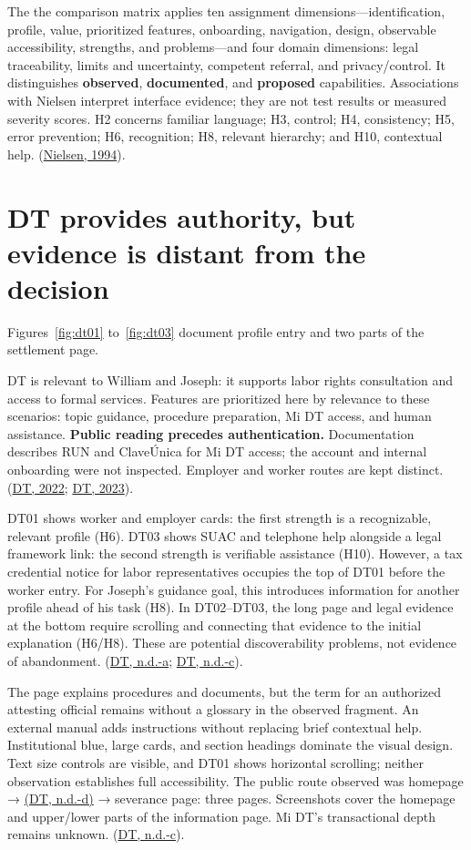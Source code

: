 The the comparison matrix applies ten assignment dimensions—identification, profile, value, prioritized features, onboarding, navigation, design, observable accessibility, strengths, and problems—and four domain dimensions: legal traceability, limits and uncertainty, competent referral, and privacy/control. It distinguishes \textbf{observed}, \textbf{documented}, and \textbf{proposed} capabilities. Associations with Nielsen interpret interface evidence; they are not test results or measured severity scores. H2 concerns familiar language; H3, control; H4, consistency; H5, error prevention; H6, recognition; H8, relevant hierarchy; and H10, contextual help. (\hyperref[ref:nielsen]{Nielsen, 1994}).


\section{DT provides authority, but evidence is distant from the decision}

Figures~\ref{fig:dt01} to~\ref{fig:dt03} document profile entry and two parts of the settlement page.

DT is relevant to William and Joseph: it supports labor rights consultation and access to formal services. Features are prioritized here by relevance to these scenarios: topic guidance, procedure preparation, Mi DT access, and human assistance. \textbf{Public reading precedes authentication.} Documentation describes RUN and ClaveÚnica for Mi DT access; the account and internal onboarding were not inspected. Employer and worker routes are kept distinct. (\hyperref[ref:dt_perfiles]{DT, 2022}; \hyperref[ref:dt_ingreso]{DT, 2023}).


DT01 shows worker and employer cards: the first strength is a recognizable, relevant profile (H6). DT03 shows SUAC and telephone help alongside a legal framework link: the second strength is verifiable assistance (H10). However, a tax credential notice for labor representatives occupies the top of DT01 before the worker entry. For Joseph's guidance goal, this introduces information for another profile ahead of his task (H8). In DT02–DT03, the long page and legal evidence at the bottom require scrolling and connecting that evidence to the initial explanation (H6/H8). These are potential discoverability problems, not evidence of abandonment. (\hyperref[ref:dt_inicio]{DT, n.d.-a}; \hyperref[ref:dt_finiquito]{DT, n.d.-c}).


The page explains procedures and documents, but the term for an authorized attesting official remains without a glossary in the observed fragment. An external manual adds instructions without replacing brief contextual help. Institutional blue, large cards, and section headings dominate the visual design. Text size controls are visible, and DT01 shows horizontal scrolling; neither observation establishes full accessibility. The public route observed was homepage → \hyperref[ref:dt_trabajadores]{(DT, n.d.-d)} → severance page: three pages. Screenshots cover the homepage and upper/lower parts of the information page. Mi DT's transactional depth remains unknown. (\hyperref[ref:dt_finiquito]{DT, n.d.-c}).


